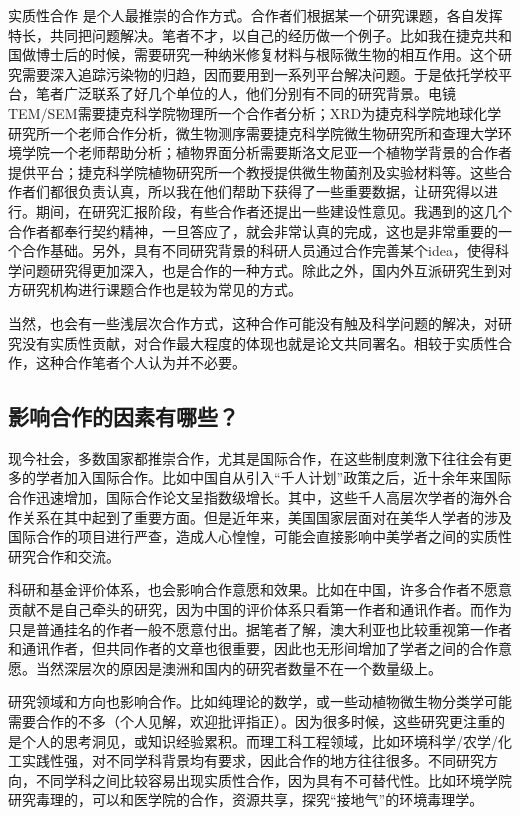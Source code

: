\documentclass[
]{book}
\begin{document}
实质性合作 是个人最推崇的合作方式。合作者们根据某一个研究课题，各自发挥特长，共同把问题解决。笔者不才，以自己的经历做一个例子。比如我在捷克共和国做博士后的时候，需要研究一种纳米修复材料与根际微生物的相互作用。这个研究需要深入追踪污染物的归趋，因而要用到一系列平台解决问题。于是依托学校平台，笔者广泛联系了好几个单位的人，他们分别有不同的研究背景。电镜TEM/SEM需要捷克科学院物理所一个合作者分析；XRD为捷克科学院地球化学研究所一个老师合作分析，微生物测序需要捷克科学院微生物研究所和查理大学环境学院一个老师帮助分析；植物界面分析需要斯洛文尼亚一个植物学背景的合作者提供平台；捷克科学院植物研究所一个教授提供微生物菌剂及实验材料等。这些合作者们都很负责认真，所以我在他们帮助下获得了一些重要数据，让研究得以进行。期间，在研究汇报阶段，有些合作者还提出一些建设性意见。我遇到的这几个合作者都奉行契约精神，一旦答应了，就会非常认真的完成，这也是非常重要的一个合作基础。另外，具有不同研究背景的科研人员通过合作完善某个idea，使得科学问题研究得更加深入，也是合作的一种方式。除此之外，国内外互派研究生到对方研究机构进行课题合作也是较为常见的方式。

当然，也会有一些浅层次合作方式，这种合作可能没有触及科学问题的解决，对研究没有实质性贡献，对合作最大程度的体现也就是论文共同署名。相较于实质性合作，这种合作笔者个人认为并不必要。

\hypertarget{ux5f71ux54cdux5408ux4f5cux7684ux56e0ux7d20ux6709ux54eaux4e9b}{%
\subsection{影响合作的因素有哪些？}\label{ux5f71ux54cdux5408ux4f5cux7684ux56e0ux7d20ux6709ux54eaux4e9b}}

现今社会，多数国家都推崇合作，尤其是国际合作，在这些制度刺激下往往会有更多的学者加入国际合作。比如中国自从引入``千人计划''政策之后，近十余年来国际合作迅速增加，国际合作论文呈指数级增长。其中，这些千人高层次学者的海外合作关系在其中起到了重要方面。但是近年来，美国国家层面对在美华人学者的涉及国际合作的项目进行严查，造成人心惶惶，可能会直接影响中美学者之间的实质性研究合作和交流。

科研和基金评价体系，也会影响合作意愿和效果。比如在中国，许多合作者不愿意贡献不是自己牵头的研究，因为中国的评价体系只看第一作者和通讯作者。而作为只是普通挂名的作者一般不愿意付出。据笔者了解，澳大利亚也比较重视第一作者和通讯作者，但共同作者的文章也很重要，因此也无形间增加了学者之间的合作意愿。当然深层次的原因是澳洲和国内的研究者数量不在一个数量级上。

研究领域和方向也影响合作。比如纯理论的数学，或一些动植物微生物分类学可能需要合作的不多（个人见解，欢迎批评指正）。因为很多时候，这些研究更注重的是个人的思考洞见，或知识经验累积。而理工科工程领域，比如环境科学/农学/化工实践性强，对不同学科背景均有要求，因此合作的地方往往很多。不同研究方向，不同学科之间比较容易出现实质性合作，因为具有不可替代性。比如环境学院研究毒理的，可以和医学院的合作，资源共享，探究``接地气''的环境毒理学。
\end{document}
